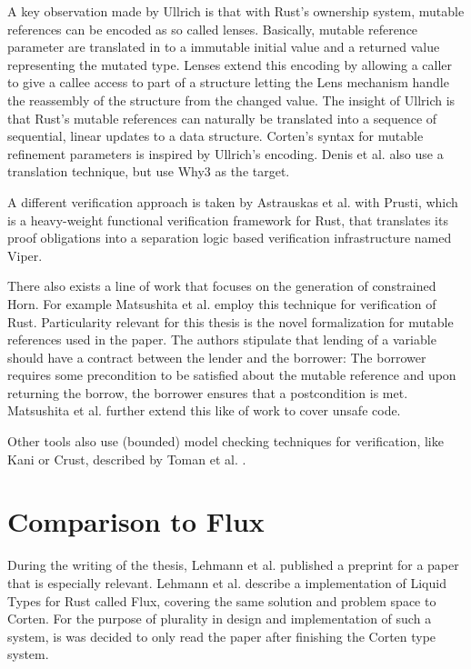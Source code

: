 A key observation made by Ullrich is that with Rust's ownership system, mutable references can be encoded as so called lenses\cite{foster_combinators_2007}. Basically, mutable reference parameter are translated in to a immutable initial value and a returned value representing the mutated type. Lenses extend this encoding by allowing a caller to give a callee access to part of a structure letting the Lens mechanism handle the reassembly of the structure from the changed value. The insight of Ullrich is that Rust's mutable references can naturally be translated into a sequence of sequential, linear updates to a data structure. 
Corten's syntax for mutable refinement parameters is inspired by Ullrich's encoding.
Denis et al. \cite{denis_creusot_2021} also use a translation technique, but use Why3 as the target.

A different verification approach is taken by Astrauskas et al. \cite{astrauskas_leveraging_2019} with Prusti, which is a heavy-weight functional verification framework for Rust, that translates its proof obligations into a separation logic based verification infrastructure named Viper.

There also exists a line of work that focuses on the generation of constrained Horn. For example Matsushita et al. \cite{matsushita_rusthorn_2020} employ this technique for verification of Rust. Particularity relevant for this thesis is the novel formalization for mutable references used in the paper. 
The authors stipulate that lending of a variable should have a contract between the lender and the borrower: The borrower requires some precondition to be satisfied about the mutable reference and upon returning the borrow, the borrower ensures that a postcondition is met. Matsushita et al. \cite{matsushita_rusthornbelt_2022} further extend this like of work to cover unsafe code.

Other tools also use (bounded) model checking techniques for verification, like Kani \cite{noauthor_announcing_2022} or Crust, described by Toman et al. \cite{toman_crust_2015}.

\section{Comparison to Flux} \label{sec:flux}

During the writing of the thesis, Lehmann et al. \cite{lehmann_flux_2022} published a preprint for a paper that is especially relevant. Lehmann et al. describe a implementation of Liquid Types for Rust called Flux, covering the same solution and problem space to Corten. 
For the purpose of plurality in design and implementation of such a system, is was decided to only read the paper after finishing the Corten type system.

